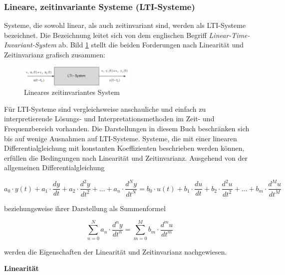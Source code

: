 \subsubsection{Lineare, zeitinvariante Systeme (LTI-Systeme)}\label{threetwothree}

Systeme, die sowohl linear, als auch zeitinvariant sind, werden als LTI-Systeme bezeichnet. Die Bezeichnung leitet sich von dem englischen Begriff \textit{Linear-Time-Invariant-System } ab. Bild \ref{fig:Zeitinvarianzsys} stellt die beiden Forderungen nach Linearität und Zeitinvarianz grafisch zusammen:


\begin{figure}[H]
  \centerline{\includegraphics[width=0.5\textwidth]{Kapitel2/Bilder/image11}}
  \caption{Lineares zeitinvariantes System} 
  \label{fig:Zeitinvarianzsys}
\end{figure}

\noindent Für LTI-Systeme sind vergleichsweise anschauliche und einfach zu interpretierende Lösungs- und Interpretationsmethoden im Zeit- und Frequenzbereich vorhanden. Die Darstellungen in diesem Buch beschränken sich bis auf wenige Ausnahmen auf LTI-Systeme.\newline
Systeme, die mit einer linearen Differentialgleichung mit konstanten Koeffizienten beschrieben werden können, erfüllen die Bedingungen nach Linearität und Zeitinvarianz. Ausgehend von der allgemeinen Differentialgleichung

\begin{equation}\label{eq:threefourtyfive}
a_{0}\cdot y(t) + a_{1}\cdot \frac{dy}{dt}+a_{2}\cdot \frac{d^2y}{dt^2}+ ... +a_{n}\cdot \frac{d^Ny}{dt^N}=
b_{0}\cdot u(t) + b_{1}\cdot \frac{du}{dt}+b_{2}\cdot \frac{d^2u}{dt^2}+ ... +b_{m}\cdot \frac{d^Mu}{dt^M}
\end{equation}

\noindent beziehungsweise ihrer Darstellung als Summenformel

\begin{equation}\label{eq:threefourtysix}
\sum_{n=0}^{N}a_{n} \cdot  \frac{d^ny}{dt^n} =
\sum_{m=0}^{M}b_{m} \cdot  \frac{d^mu}{dt^m}
\end{equation}

\noindent werden die Eigenschaften der Linearität und Zeitinvarianz nachgewiesen.\bigskip

{\selectfont\noindent \textbf{Linearität}}\smallskip

